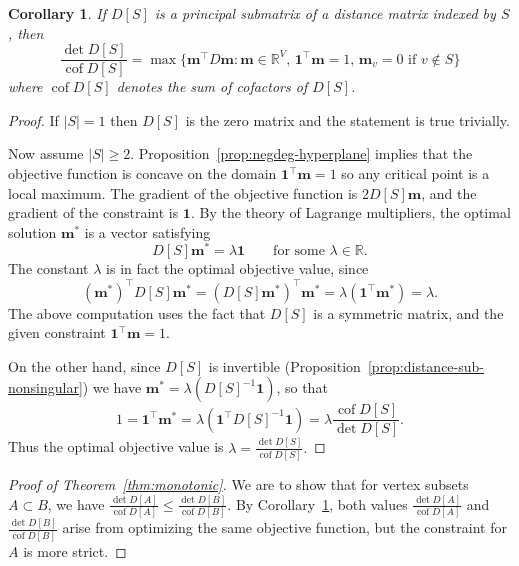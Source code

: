 \documentclass{amsart}
\newtheorem{cor}[thm]{Corollary}
\theoremstyle{definition}
\newcommand{\RR}{\mathbb{R}}
\newcommand{\bone}{\mathbf{1}}
\newcommand{\boldm}{\mathbf{m}}
\newcommand{\tr}{\intercal}
\DeclareMathOperator{\cof}{cof}
\newcommand{\display}{\displaystyle}
\begin{document}
\begin{cor}
\label{cor:optimization}
If $D[S]$ is a principal submatrix of a distance matrix indexed by $S$, then 
\[
	\frac{\det D[S]}{\cof D[S]} = \max \{\boldm^\tr D \boldm : \boldm \in \RR^V,\, \bone^\tr \boldm = 1,\, \boldm_v = 0 \text{ if } v \not\in S \}
\]
where $\cof D[S]$ denotes the sum of cofactors of $D[S]$.
\end{cor}

\begin{proof}
If $|S| = 1$ then $D[S]$ is the zero matrix and the statement is true trivially.

Now assume $|S| \geq 2$.
Proposition~\ref{prop:negdeg-hyperplane} implies that 
the objective function is concave on the domain $\bone^\tr \boldm = 1$
so any critical point is a local maximum.
The gradient of the objective function is $2 D[S] \boldm$, 
and the gradient of the constraint is $\bone$.
By the theory of Lagrange multipliers, the optimal solution $\boldm^*$ is a vector satisfying
\[
	D[S] \boldm^* = \lambda \bone \qquad\text{for some }\lambda \in \RR.
\]
The constant $\lambda$ is in fact the optimal objective value, since
\[
	(\boldm^*)^\tr D[S] \boldm^* = (D[S] \boldm^*)^\tr \boldm^* = \lambda (\bone^\tr \boldm^*) = \lambda.
\]
The above computation uses the fact that $D[S]$ is a symmetric matrix, and the given constraint $\bone^\tr \boldm = 1$.

On the other hand,
since $D[S]$ is invertible (Proposition~\ref{prop:distance-sub-nonsingular}) we have $ \boldm^* = \lambda (D[S]^{-1} \bone) $, so that
\[
	1 = \bone^\tr \boldm^* = \lambda (\bone^\tr D[S]^{-1} \bone)
	= \lambda \frac{\cof D[S]}{\det D[S]}.
\]
Thus the optimal objective value is
$\displaystyle
	\lambda = \frac{\det D[S]}{\cof D[S]} .
$
\end{proof}

\begin{proof}[Proof of Theorem~\ref{thm:monotonic}]
We are to show that for vertex subsets $A \subset B$, we have
$\displaystyle 
\frac{\det D[A]}{\cof D[A]} \leq \frac{\det D[B]}{\cof D[B]}.
$
By Corollary~\ref{cor:optimization}, both values $\display \frac{\det D[A]}{\cof D[A]}$ and $\display \frac{\det D[B]}{\cof D[B]}$ arise from optimizing the same objective function, 
but the constraint for $A$ is more strict.
\end{proof}
\end{document}
